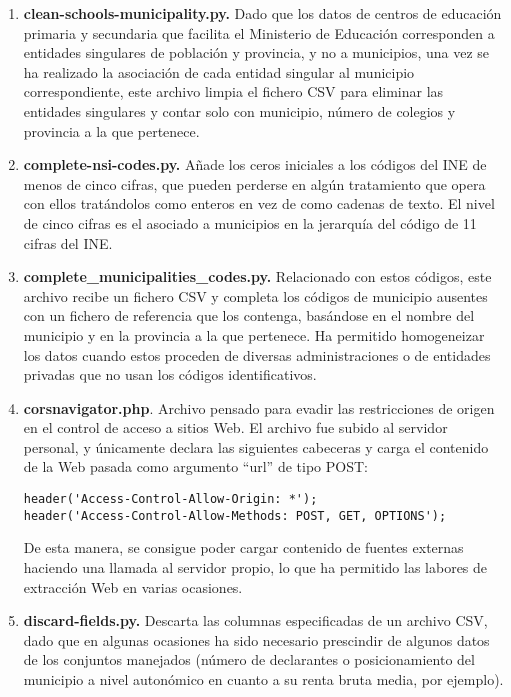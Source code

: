 \begin{enumerate}
    \item \textbf{clean-schools-municipality.py.} Dado que los datos de centros de educación primaria y secundaria que facilita el Ministerio de Educación corresponden a entidades singulares de población y provincia, y no a municipios, una vez se ha realizado la asociación de cada entidad singular al municipio correspondiente, este archivo limpia el fichero CSV para eliminar las entidades singulares y contar solo con municipio, número de colegios y provincia a la que pertenece.
    
    \item \textbf{complete-nsi-codes.py.} Añade los ceros iniciales a los códigos del INE de menos de cinco cifras, que pueden perderse en algún tratamiento que opera con ellos tratándolos como enteros en vez de como cadenas de texto. El nivel de cinco cifras es el asociado a municipios en la jerarquía del código de 11 cifras del INE.
    
    \item \textbf{complete\_municipalities\_codes.py.} Relacionado con estos códigos, este archivo recibe un fichero CSV y completa los códigos de municipio ausentes con un fichero de referencia que los contenga, basándose en el nombre del municipio y en la provincia a la que pertenece. Ha permitido homogeneizar los datos cuando estos proceden de diversas administraciones o de entidades privadas que no usan los códigos identificativos.
    
    \item \textbf{corsnavigator.php}. Archivo pensado para evadir las restricciones de origen en el control de acceso a sitios Web. El archivo fue subido al servidor personal, y únicamente declara las siguientes cabeceras y carga el contenido de la Web pasada como argumento ``url'' de tipo POST:
    \begin{verbatim}
header('Access-Control-Allow-Origin: *');
header('Access-Control-Allow-Methods: POST, GET, OPTIONS');
    \end{verbatim}
    
    De esta manera, se consigue poder cargar contenido de fuentes externas haciendo una llamada al servidor propio, lo que ha permitido las labores de extracción Web en varias ocasiones.

    \item \textbf{discard-fields.py.} Descarta las columnas especificadas de un archivo CSV, dado que en algunas ocasiones ha sido necesario prescindir de algunos datos de los conjuntos manejados (número de declarantes o posicionamiento del municipio a nivel autonómico en cuanto a su renta bruta media, por ejemplo).
       

\end{enumerate}
